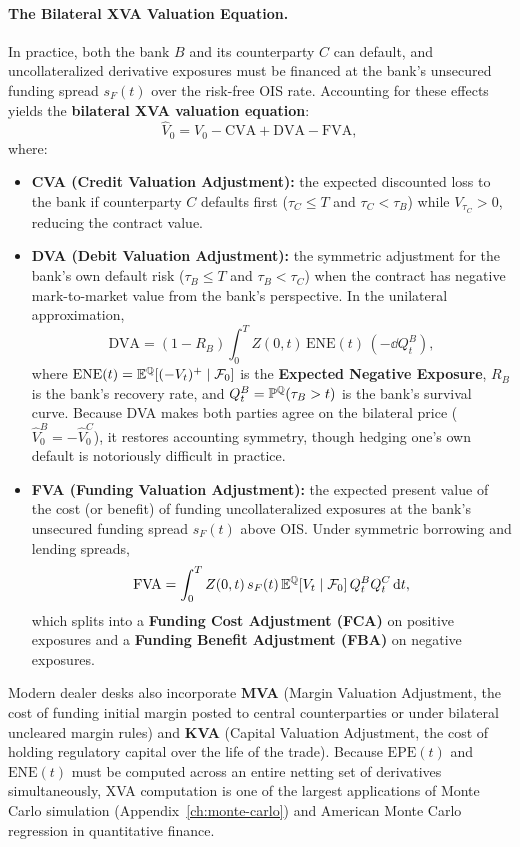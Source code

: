 \paragraph{The Bilateral XVA Valuation Equation.}
In practice, both the bank $B$ and its counterparty $C$ can default, and uncollateralized derivative exposures must be financed at the bank's unsecured funding spread $s_F(t)$ over the risk-free OIS rate. Accounting for these effects yields the \textbf{bilateral XVA valuation equation}:
\begin{equation}\label{eq:xva-equation}
\widehat{V}_0 = V_0 - \mathrm{CVA} + \mathrm{DVA} - \mathrm{FVA},
\end{equation}
where:
\begin{itemize}
    \item \textbf{CVA (Credit Valuation Adjustment):} the expected discounted loss to the bank if counterparty $C$ defaults first ($\tau_C \leq T$ and $\tau_C < \tau_B$) while $V_{\tau_C} > 0$, reducing the contract value.
    \item \textbf{DVA (Debit Valuation Adjustment):} the symmetric adjustment for the bank's own default risk ($\tau_B \leq T$ and $\tau_B < \tau_C$) when the contract has negative mark-to-market value from the bank's perspective. In the unilateral approximation,
    \[
    \mathrm{DVA} = (1 - R_B)\int_0^T Z(0, t)\,\mathrm{ENE}(t)\,(-\dd Q_t^B),
    \]
    where $\mathrm{ENE}(t) = \mathbb{E}^{\mathbb{Q}}[(-V_t)^+ \mid \mathcal{F}_0]$ is the \textbf{Expected Negative Exposure}, $R_B$ is the bank's recovery rate, and $Q_t^B = \mathbb{P}^{\mathbb{Q}}(\tau_B > t)$ is the bank's survival curve. Because DVA makes both parties agree on the bilateral price ($\widehat{V}_0^B = -\widehat{V}_0^C$), it restores accounting symmetry, though hedging one's own default is notoriously difficult in practice.
    \item \textbf{FVA (Funding Valuation Adjustment):} the expected present value of the cost (or benefit) of funding uncollateralized exposures at the bank's unsecured funding spread $s_F(t)$ above OIS. Under symmetric borrowing and lending spreads,
    \[
    \mathrm{FVA} = \int_0^T Z(0, t)\,s_F(t)\,\mathbb{E}^{\mathbb{Q}}[V_t \mid \mathcal{F}_0]\,Q_t^B Q_t^C\,\mathrm{d} t,
    \]
    which splits into a \textbf{Funding Cost Adjustment (FCA)} on positive exposures and a \textbf{Funding Benefit Adjustment (FBA)} on negative exposures.
\end{itemize}
Modern dealer desks also incorporate \textbf{MVA} (Margin Valuation Adjustment, the cost of funding initial margin posted to central counterparties or under bilateral uncleared margin rules) and \textbf{KVA} (Capital Valuation Adjustment, the cost of holding regulatory capital over the life of the trade). Because $\mathrm{EPE}(t)$ and $\mathrm{ENE}(t)$ must be computed across an entire netting set of derivatives simultaneously, XVA computation is one of the largest applications of Monte Carlo simulation (Appendix~\ref{ch:monte-carlo}) and American Monte Carlo regression in quantitative finance.
